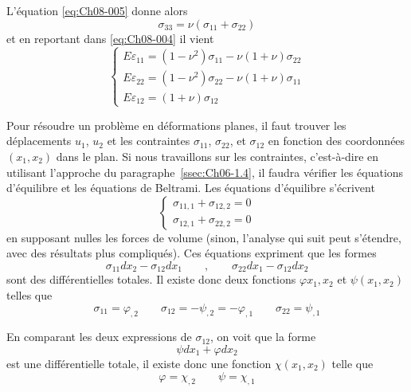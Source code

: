 L'équation \eqref{eq:Ch08-005} donne alors
\begin{equation}
    \sigma_{33}=\nu(\sigma_{11}+\sigma_{22})
    \label{eq:Ch08-006}
\end{equation}
et en reportant dans \eqref{eq:Ch08-004} il vient 
\begin{equation}
   \begin{cases}
     E\varepsilon_{11} = (1-\nu^2)\sigma_{11} - \nu(1+\nu)\sigma_{22}\\
     E\varepsilon_{22} = (1-\nu^2)\sigma_{22} - \nu(1+\nu)\sigma_{11}\\
     E\varepsilon_{12} = (1+\nu)\sigma_{12}
   \end{cases}
    \label{eq:Ch08-007}
\end{equation}

Pour résoudre un problème en déformations planes, il faut trouver les déplacements $u_1$, $u_2$ et les contraintes $\sigma_{11}$, $\sigma_{22}$, et $\sigma_{12}$ en fonction des coordonnées $(x_1,x_2)$ dans le plan.
Si nous travaillons sur les contraintes, c'est-à-dire en utilisant l'approche du paragraphe~\ref{ssec:Ch06-1.4}, il faudra vérifier les équations d'équilibre et les équations de Beltrami. 
Les équations d'équilibre s'écrivent 
\begin{equation}
   \begin{cases}
     \sigma_{11,1}+\sigma_{12,2}=0\\
     \sigma_{12,1}+\sigma_{22,2}=0
   \end{cases}
    \label{eq:Ch08-008}
\end{equation}
en supposant nulles les forces de volume (sinon, l'analyse qui suit peut s'étendre, avec des résultats plus compliqués). 
Ces équations expriment que les formes 
\begin{equation*}
\sigma_{11}dx_2-\sigma_{12}dx_1 \qquad,\qquad \sigma_{22}dx_1-\sigma_{12}dx_2
\end{equation*}
sont des différentielles totales. Il existe donc deux fonctions   $\varphi{x_1,x_2}$ et $\psi(x_1,x_2)$ telles que 
\begin{equation*}
\sigma_{11}=\varphi_{,2} \qquad \sigma_{12}=-\psi_{,2}=-\varphi_{,1} \qquad \sigma_{22}=\psi_{,1}
\end{equation*}

En comparant les deux expressions de $\sigma_{12}$, on voit que la forme 
\begin{equation*}
\psi dx_1 + \varphi dx_2
\end{equation*}
est une différentielle totale, il existe donc une fonction $\chi(x_1,x_2)$ telle que 
\begin{equation*}
\varphi=\chi_{,2} \qquad \psi=\chi_{,1}
\end{equation*}

